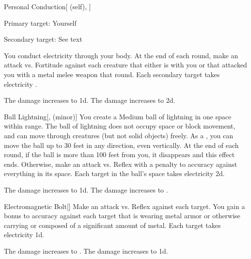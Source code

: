 \lowercase{\hypertarget{spell:Personal Conduction}{}}\label{spell:Personal Conduction}
\begin{attuneability}[Rank 3]{\hypertarget{spell:Personal Conduction}{Personal Conduction}}[ (self), ]

Primary target: Yourself
\par\noindent
Secondary target: See text

You conduct electricity through your body.
At the end of each round, make an attack vs. Fortitude against each creature that either is  with you or that attacked you with a metal melee weapon that round.
\hit Each secondary target takes electricity .

\rankline
{} The damage increases to  \plus1d.
 The damage increases to  \plus2d.
\end{attuneability}
\vspace{0.25em}



\lowercase{\hypertarget{spell:Ball Lightning}{}}\label{spell:Ball Lightning}
\begin{freeability}[Rank 4]{\hypertarget{spell:Ball Lightning}{Ball Lightning}}[,  (minor)]
You create a Medium ball of lightning in one space within \rngmed range.
The ball of lightning does not occupy space or block movement, and can move through creatures (but not solid objects) freely.
As a , you can move the ball up to 30 feet in any direction, even vertically.
At the end of each round, if the ball is more than 100 feet from you, it disappears and this effect ends.
Otherwise, make an attack vs. Reflex with a  penalty to accuracy against everything in its space.
\hit Each target in the ball's space takes electricity  \minus2d.

\rankline
{} The damage increases to  \minus1d.
 The damage increases to .
\end{freeability}
\vspace{0.25em}



\lowercase{\hypertarget{spell:Electromagnetic Bolt}{}}\label{spell:Electromagnetic Bolt}
\begin{freeability}[Rank 4]{\hypertarget{spell:Electromagnetic Bolt}{Electromagnetic Bolt}}[]
Make an attack vs. Reflex against each target.
You gain a  bonus to accuracy against each target that is wearing metal armor or otherwise carrying or composed of a significant amount of metal.
\hit Each target takes electricity  \minus1d.

\rankline
{} The damage increases to .
 The damage increases to  \plus1d.
\end{freeability}
\vspace{0.25em}



